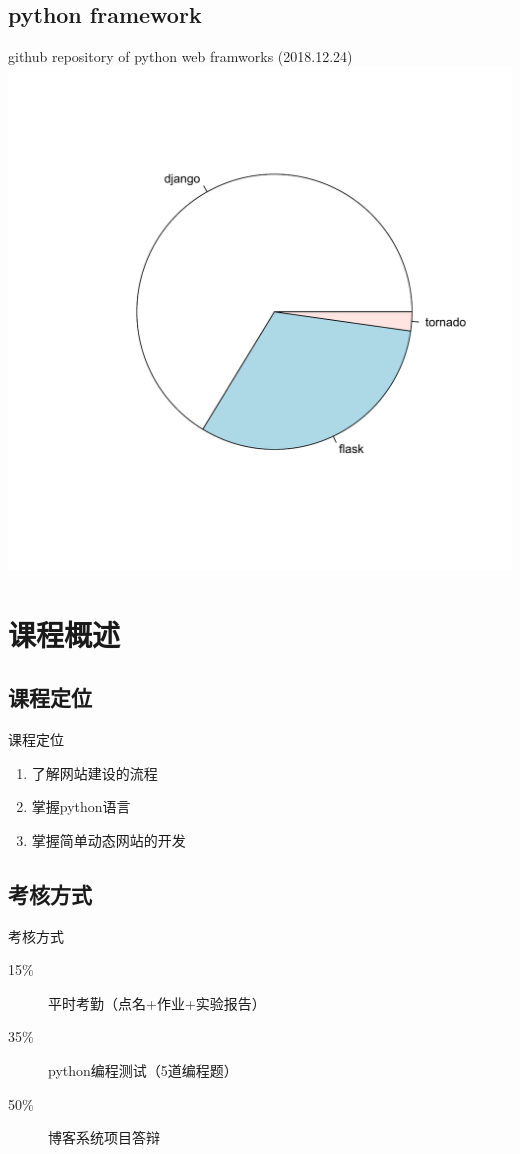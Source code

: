 \documentclass{beamer}
\begin{document}
\subsection{python framework}
\begin{frame}{github repository of python web framworks (2018.12.24)}
\includegraphics[height=1\textheight]{django-introduce-1.pdf}
\end{frame}
\section{课程概述}
\subsection{课程定位}
\begin{frame}{课程定位}
\begin{enumerate}
\item 了解网站建设的流程
\item 掌握python语言
\item 掌握简单动态网站的开发
\end{enumerate}

\end{frame}
\subsection{考核方式}
\begin{frame}{考核方式}
\begin{description}
\item[ 15\% ] 平时考勤（点名+作业+实验报告）
\item[ 35\% ] python编程测试（5道编程题） 
\item[ 50\% ] 博客系统项目答辩
\end{description}

\end{frame}
\end{document}
